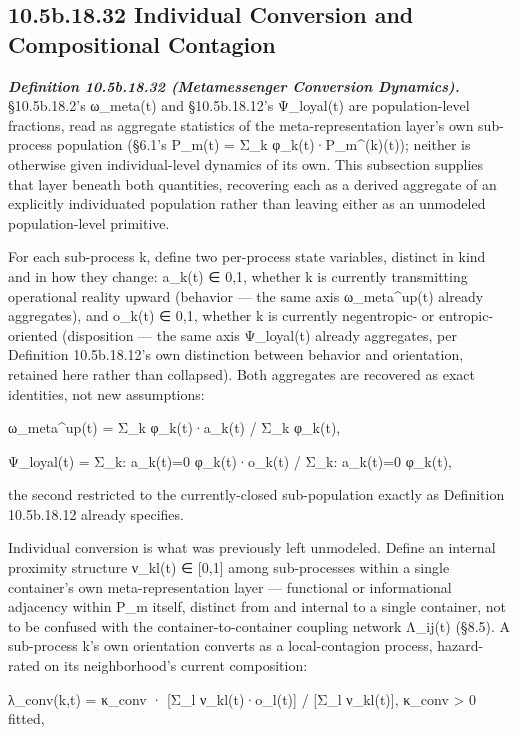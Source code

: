 \documentclass[
]{article}
\begin{document}
\hypertarget{b.18.32-individual-conversion-and-compositional-contagion}{%
\subsection{10.5b.18.32 Individual Conversion and Compositional
Contagion}\label{b.18.32-individual-conversion-and-compositional-contagion}}

\emph{\textbf{Definition 10.5b.18.32 (Metamessenger Conversion
Dynamics).}} §10.5b.18.2's ω\_meta(t) and §10.5b.18.12's Ψ\_loyal(t) are
population-level fractions, read as aggregate statistics of the
meta-representation layer's own sub-process population (§6.1's P\_m(t) =
Σ\_k φ\_k(t)·P\_m\^{}(k)(t)); neither is otherwise given
individual-level dynamics of its own. This subsection supplies that
layer beneath both quantities, recovering each as a derived aggregate of
an explicitly individuated population rather than leaving either as an
unmodeled population-level primitive.

For each sub-process k, define two per-process state variables, distinct
in kind and in how they change: a\_k(t) ∈ 0,1, whether k is currently
transmitting operational reality upward (behavior --- the same axis
ω\_meta\^{}up(t) already aggregates), and o\_k(t) ∈ 0,1, whether k is
currently negentropic- or entropic-oriented (disposition --- the same
axis Ψ\_loyal(t) already aggregates, per Definition 10.5b.18.12's own
distinction between behavior and orientation, retained here rather than
collapsed). Both aggregates are recovered as exact identities, not new
assumptions:

ω\_meta\^{}up(t) = Σ\_k φ\_k(t)·a\_k(t) / Σ\_k φ\_k(t),

Ψ\_loyal(t) = Σ\_k: a\_k(t)=0 φ\_k(t)·o\_k(t) / Σ\_k: a\_k(t)=0 φ\_k(t),

the second restricted to the currently-closed sub-population exactly as
Definition 10.5b.18.12 already specifies.

Individual conversion is what was previously left unmodeled. Define an
internal proximity structure ν\_kl(t) ∈ {[}0,1{]} among sub-processes
within a single container's own meta-representation layer --- functional
or informational adjacency within P\_m itself, distinct from and
internal to a single container, not to be confused with the
container-to-container coupling network Λ\_ij(t) (§8.5). A sub-process
k's own orientation converts as a local-contagion process, hazard-rated
on its neighborhood's current composition:

λ\_conv(k,t) = κ\_conv · {[}Σ\_l ν\_kl(t)·o\_l(t){]} / {[}Σ\_l
ν\_kl(t){]}, κ\_conv \textgreater{} 0 fitted,
\end{document}
